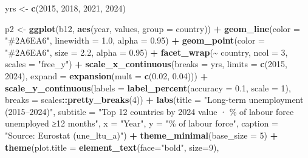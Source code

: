 \documentclass[
]{article}
\newenvironment{Shaded}{\begin{snugshade}}{\end{snugshade}}
\newcommand{\AttributeTok}[1]{\textcolor[rgb]{0.13,0.29,0.53}{#1}}
\newcommand{\DecValTok}[1]{\textcolor[rgb]{0.00,0.00,0.81}{#1}}
\newcommand{\FloatTok}[1]{\textcolor[rgb]{0.00,0.00,0.81}{#1}}
\newcommand{\FunctionTok}[1]{\textcolor[rgb]{0.13,0.29,0.53}{\textbf{#1}}}
\newcommand{\NormalTok}[1]{#1}
\newcommand{\OtherTok}[1]{\textcolor[rgb]{0.56,0.35,0.01}{#1}}
\newcommand{\SpecialCharTok}[1]{\textcolor[rgb]{0.81,0.36,0.00}{\textbf{#1}}}
\newcommand{\StringTok}[1]{\textcolor[rgb]{0.31,0.60,0.02}{#1}}
\begin{document}
\begin{Shaded}
\begin{Highlighting}[]
\NormalTok{yrs }\OtherTok{\textless{}{-}} \FunctionTok{c}\NormalTok{(}\DecValTok{2015}\NormalTok{, }\DecValTok{2018}\NormalTok{, }\DecValTok{2021}\NormalTok{, }\DecValTok{2024}\NormalTok{)}

\NormalTok{p2 }\OtherTok{\textless{}{-}} \FunctionTok{ggplot}\NormalTok{(b12, }\FunctionTok{aes}\NormalTok{(year, values, }\AttributeTok{group =}\NormalTok{ country)) }\SpecialCharTok{+}
\FunctionTok{geom\_line}\NormalTok{(}\AttributeTok{color =} \StringTok{"\#2A6EA6"}\NormalTok{, }\AttributeTok{linewidth =} \FloatTok{1.0}\NormalTok{, }\AttributeTok{alpha =} \FloatTok{0.95}\NormalTok{) }\SpecialCharTok{+}
\FunctionTok{geom\_point}\NormalTok{(}\AttributeTok{color =} \StringTok{"\#2A6EA6"}\NormalTok{, }\AttributeTok{size =} \FloatTok{2.2}\NormalTok{, }\AttributeTok{alpha =} \FloatTok{0.95}\NormalTok{) }\SpecialCharTok{+}
\FunctionTok{facet\_wrap}\NormalTok{(}\SpecialCharTok{\textasciitilde{}}\NormalTok{ country, }\AttributeTok{ncol =} \DecValTok{3}\NormalTok{, }\AttributeTok{scales =} \StringTok{"free\_y"}\NormalTok{) }\SpecialCharTok{+}
\FunctionTok{scale\_x\_continuous}\NormalTok{(}\AttributeTok{breaks =}\NormalTok{ yrs, }\AttributeTok{limits =} \FunctionTok{c}\NormalTok{(}\DecValTok{2015}\NormalTok{, }\DecValTok{2024}\NormalTok{),}
\AttributeTok{expand =} \FunctionTok{expansion}\NormalTok{(}\AttributeTok{mult =} \FunctionTok{c}\NormalTok{(}\FloatTok{0.02}\NormalTok{, }\FloatTok{0.04}\NormalTok{))) }\SpecialCharTok{+}
\FunctionTok{scale\_y\_continuous}\NormalTok{(}\AttributeTok{labels =} \FunctionTok{label\_percent}\NormalTok{(}\AttributeTok{accuracy =} \FloatTok{0.1}\NormalTok{, }\AttributeTok{scale =} \DecValTok{1}\NormalTok{),}
\AttributeTok{breaks =}\NormalTok{ scales}\SpecialCharTok{::}\FunctionTok{pretty\_breaks}\NormalTok{(}\DecValTok{4}\NormalTok{)) }\SpecialCharTok{+}
\FunctionTok{labs}\NormalTok{(}\AttributeTok{title =} \StringTok{"Long{-}term unemployment (2015–2024)"}\NormalTok{,}
\AttributeTok{subtitle =} \StringTok{"Top 12 countries by 2024 value · \% of labour force unemployed ≥12 months"}\NormalTok{,}
\AttributeTok{x =} \StringTok{"Year"}\NormalTok{, }\AttributeTok{y =} \StringTok{"\% of labour force"}\NormalTok{,}
\AttributeTok{caption =} \StringTok{"Source: Eurostat (une\_ltu\_a)"}\NormalTok{) }\SpecialCharTok{+}
\FunctionTok{theme\_minimal}\NormalTok{(}\AttributeTok{base\_size =} \DecValTok{5}\NormalTok{) }\SpecialCharTok{+}
\FunctionTok{theme}\NormalTok{(}\AttributeTok{plot.title =} \FunctionTok{element\_text}\NormalTok{(}\AttributeTok{face=}\StringTok{"bold"}\NormalTok{, }\AttributeTok{size=}\DecValTok{9}\NormalTok{),}

\end{Highlighting}
\end{Shaded}
\end{document}
